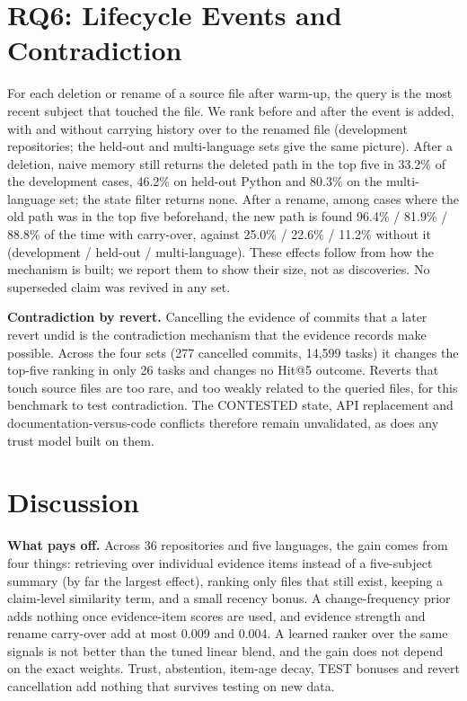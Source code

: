 \documentclass[conference]{IEEEtran}
\begin{document}
\section{RQ6: Lifecycle Events and Contradiction}
\label{sec:life}
For each deletion or rename of a source file after warm-up, the query is the most recent subject that touched the file. We rank before and after the event is added, with and without carrying history over to the renamed file (development repositories; the held-out and multi-language sets give the same picture). After a deletion, naive memory still returns the deleted path in the top five in 33.2\% of the development cases, 46.2\% on held-out Python and 80.3\% on the multi-language set; the state filter returns none. After a rename, among cases where the old path was in the top five beforehand, the new path is found 96.4\% / 81.9\% / 88.8\% of the time with carry-over, against 25.0\% / 22.6\% / 11.2\% without it (development / held-out / multi-language). These effects follow from how the mechanism is built; we report them to show their size, not as discoveries. No superseded claim was revived in any set.

\textbf{Contradiction by revert.} Cancelling the evidence of commits that a later revert undid is the contradiction mechanism that the evidence records make possible. Across the four sets (277 cancelled commits, 14{,}599 tasks) it changes the top-five ranking in only 26 tasks and changes no Hit@5 outcome. Reverts that touch source files are too rare, and too weakly related to the queried files, for this benchmark to test contradiction. The CONTESTED state, API replacement and documentation-versus-code conflicts therefore remain unvalidated, as does any trust model built on them.

\section{Discussion}
\textbf{What pays off.} Across 36 repositories and five languages, the gain comes from four things: retrieving over individual evidence items instead of a five-subject summary (by far the largest effect), ranking only files that still exist, keeping a claim-level similarity term, and a small recency bonus. A change-frequency prior adds nothing once evidence-item scores are used, and evidence strength and rename carry-over add at most 0.009 and 0.004. A learned ranker over the same signals is not better than the tuned linear blend, and the gain does not depend on the exact weights. Trust, abstention, item-age decay, TEST bonuses and revert cancellation add nothing that survives testing on new data.
\end{document}

